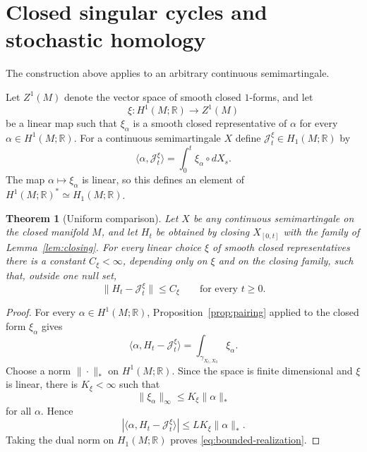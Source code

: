 \documentclass[a4paper,reqno]{amsart}
\newcommand{\R}{\mathbb R}
\newtheorem{theorem}{Theorem}[section]
\theoremstyle{definition}
\begin{document}
\section{Closed singular cycles and stochastic homology}\label{sec:realization}

The construction above applies to an arbitrary continuous semimartingale.

Let $Z^1(M)$ denote the vector space of smooth closed $1$-forms, and let
\[
   \xi:H^1(M;\R)\longrightarrow Z^1(M)
\]
be a linear map such that $\xi_\alpha$ is a smooth closed representative of
$\alpha$ for every $\alpha\in H^1(M;\R)$.  For a continuous semimartingale
$X$ define $\mathcal J_t^\xi\in H_1(M;\R)$ by
\begin{equation}\label{eq:Jxi}
   \langle\alpha,\mathcal J_t^\xi\rangle
   =\int_0^t \xi_\alpha\circ dX_s .
\end{equation}
The map $\alpha\mapsto\xi_\alpha$ is linear, so this defines an element
of $H^1(M;\R)^*\simeq H_1(M;\R)$.

\begin{theorem}[Uniform comparison]\label{thm:bounded-realization}
Let $X$ be any continuous semimartingale on the closed manifold $M$, and let
$H_t$ be obtained by closing $X_{[0,t]}$ with the family of Lemma~\ref{lem:closing}.
For every linear choice $\xi$ of smooth closed representatives there is a
constant $C_\xi<\infty$, depending only on $\xi$ and on the closing family,
such that, outside one null set,
\begin{equation}\label{eq:bounded-realization}
   \|H_t-\mathcal J_t^\xi\|\le C_\xi
   \qquad\text{for every }t\ge0.
\end{equation}
\end{theorem}

\begin{proof}
For every $\alpha\in H^1(M;\R)$, Proposition~\ref{prop:pairing} applied to the
closed form $\xi_\alpha$ gives
\begin{equation}\label{eq:bounded-realization-pair}
   \langle\alpha,H_t-\mathcal J_t^\xi\rangle
   =\int_{\gamma_{X_t,X_0}}\xi_\alpha .
\end{equation}
Choose a norm $\|\cdot\|_*$ on $H^1(M;\R)$.  Since the space is finite
dimensional and $\xi$ is linear, there is $K_\xi<\infty$ such that
\[
   \|\xi_\alpha\|_\infty\le K_\xi\|\alpha\|_*
\]
for all $\alpha$.  Hence
\[
   |\langle\alpha,H_t-\mathcal J_t^\xi\rangle|
   \le L K_\xi\|\alpha\|_* .
\]
Taking the dual norm on $H_1(M;\R)$ proves \eqref{eq:bounded-realization}.
\end{proof}
\end{document}
